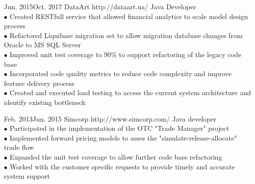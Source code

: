 \documentclass[10pt]{article} %
\begin{document}
\job
{Jun. 2015}{Oct. 2017}
{DataArt}
{http://dataart.ua/}
{Java Developer}
{
\textbf{}  
\\$\bullet$ Created RESTfull service that allowed financial analytics to scale model design process 
\\$\bullet$ Refactored Liquibase migration set to allow migration database changes from Oracle to MS SQL Server
\\$\bullet$ Improved unit test coverage to 90\% to support refactoring of the legacy code base
\\$\bullet$ Incorporated code quality metrics to reduce code complexity and improve feature delivery process
\\$\bullet$ Created and executed load testing to access the current system architecture and identify existing bottleneck 
 }

\job
{Feb. 2013}{Jun. 2015}
{Simcorp}
{http://www.simcorp.com/}
{Java developer}
{
\textbf{}  
\\$\bullet$ Participated in the implementation of the OTC "Trade Manager" project 
\\$\bullet$ Implemented forward pricing models to asses the "simulate-release-allocate" trade flow
\\$\bullet$ Expanded the unit test coverage to allow further code base refactoring 
\\$\bullet$ Worked with the customer specific requests to provide timely and accurate system support
 }
\end{document}
